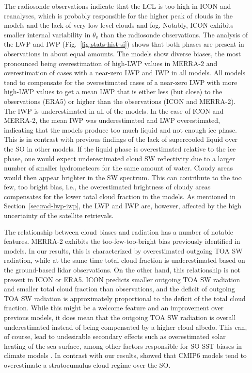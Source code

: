 \documentclass[draft]{agujournal2019}
\begin{document}
The radiosonde observations indicate that the LCL is too high in ICON and reanalyses, which is probably responsible for the higher peak of clouds in the models and the lack of very low-level clouds and fog. Notably, ICON exhibits smaller internal variability in $\theta_v$ than the radiosonde observations. The analysis of the LWP and IWP (Fig.~\ref{fig:stats-hist-si}) shows that both phases are present in observations in about equal amounts. The models show diverse biases, the most pronounced being overestimation of high-LWP values in MERRA-2 and overestimation of cases with a near-zero LWP and IWP in all models. All models tend to compensate for the overestimated cases of a near-zero LWP with more high-LWP values to get a mean LWP that is either less (but close) to the observations (ERA5) or higher than the observations (ICON and MERRA-2). The IWP is underestimated in all of the models. In the case of ICON and MERRA-2, the mean IWP was underestimated and LWP overestimated, indicating that the models produce too much liquid and not enough ice phase. This is in contrast with previous findings of the lack of supercooled liquid over the SO in other models. If the liquid phase is overestimated relative to the ice phase, one would expect underestimated cloud SW reflectivity due to a larger number of smaller hydrometeors for the same amount of water. Cloudy areas would then appear brighter in the SW spectrum. This can contribute to the too few, too bright bias, i.e., the overestimated brightness of cloudy areas compensates for the lower total cloud fraction in the models. As mentioned in Section~\ref{sec:rad-lwp-iwp}, the LWP and IWP are, however, affected by the high uncertainty of the satellite retrievals.

The relationship between cloud biases and radiation has a number of notable features. MERRA-2 exhibits the too-few-too-bright bias previously identified in models. In our results, this is characterized by overestimated outgoing TOA SW radiation, while at the same time total cloud fraction is underestimated based on the ground-based lidar observations. On the other hand, this relationship is not present in ICON or ERA5. ICON predicts smaller outgoing TOA SW radiation and smaller total cloud fraction than observations, and the deficit of outgoing TOA SW radiation is approximately proportional to the deficit of the total cloud fraction. While this might be a welcome feature and an improvement over previous models, it does mean that the outgoing TOA SW radiation is overall underestimated instead of being compensated by a higher cloud albedo. This can, of course, lead to undesirable secondary effects such as overestimated solar heating of the sea surface, among other factors responsible for SO SST biases in climate models \cite{zhang2023,luo2023,hyder2018}. In contrast with our results,  showed that CMIP6 models tend to overestimate a stratocumulus cloud regime over the SO.
\end{document}
